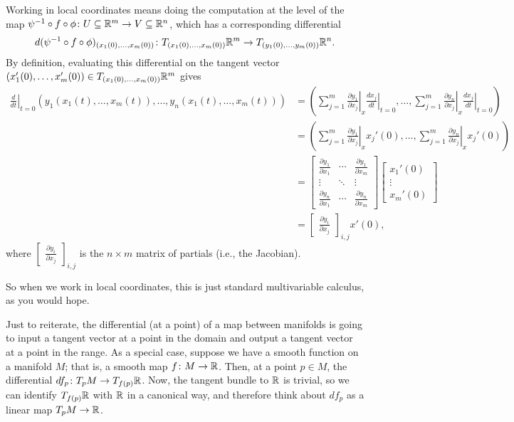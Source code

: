 Working in local coordinates means doing the computation at the level of the map $\psi^{-1} \circ f \circ \phi \colon\thinspace\! U \subseteq \mathbb{R}^m \to V \subseteq \mathbb{R}^n$, which has a corresponding differential
\[
	d(\psi^{-1} \circ f \circ \phi)_{(x_1(0),\dots , x_m(0))} \colon\thinspace\! T_{(x_1(0),\dots , x_m(0))} \mathbb{R}^m \to T_{(y_1(0), \dots , y_m(0))} \mathbb{R}^n.
\]
By definition, evaluating this differential on the tangent vector $(x_1'(0), \dots , x_m'(0)) \in T_{(x_1(0),\dots , x_m(0))}\mathbb{R}^m$ gives
\begin{align*}
	\left. \frac{d}{dt} \right|_{t=0} (y_1(x_1(t),\dots , x_m(t)), \dots , y_n(x_1(t),\dots , x_m(t))) & = \left( \sum_{j=1}^m \left.\frac{\partial y_1}{\partial x_j}\right|_{x} \left.\frac{d x_j}{dt} \right|_{t=0}, \dots , \sum_{j=1}^m \left.\frac{\partial y_n}{\partial x_j} \right|_x \left. \frac{d x_j}{dt} \right|_{t=0} \right) \\
	& = \left( \sum_{j=1}^m \left.\frac{\partial y_1}{\partial x_j}\right|_{x} x_j'(0), \dots , \sum_{j=1}^m \left.\frac{\partial y_n}{\partial x_j} \right|_x x_j'(0) \right) \\
	& = \begin{bmatrix} \frac{\partial y_1}{\partial x_1} & \cdots & \frac{\partial y_1}{\partial x_m} \\ \vdots & \ddots & \vdots \\ \frac{\partial y_n}{\partial x_1} & \cdots & \frac{\partial y_n}{\partial x_m} \end{bmatrix} \begin{bmatrix} x_1'(0) \\ \vdots \\ x_m'(0) \end{bmatrix} \\
	& = \begin{bmatrix} \frac{\partial y_i}{\partial x_j} \end{bmatrix}_{i,j} x'(0),
\end{align*}
where $\begin{bmatrix} \frac{\partial y_i}{\partial x_j} \end{bmatrix}_{i,j} $ is the $n \times m$ matrix of partials (i.e., the Jacobian).

So when we work in local coordinates, this is just standard multivariable calculus, as you would hope.

Just to reiterate, the differential (at a point) of a map between manifolds is going to input a tangent vector at a point in the domain and output a tangent vector at a point in the range. As a special case, suppose we have a smooth function on a manifold $M$; that is, a smooth map $f \colon\thinspace\! M \to \mathbb{R}$. Then, at a point $p \in M$, the differential $df_p \colon\thinspace\! T_p M \to T_{f(p)}\mathbb{R}$. Now, the tangent bundle to $\mathbb{R}$ is trivial, so we can identify $T_{f(p)}\mathbb{R}$ with $\mathbb{R}$ in a canonical way, and therefore think about $df_p$ as a linear map $T_pM \to \mathbb{R}$.

